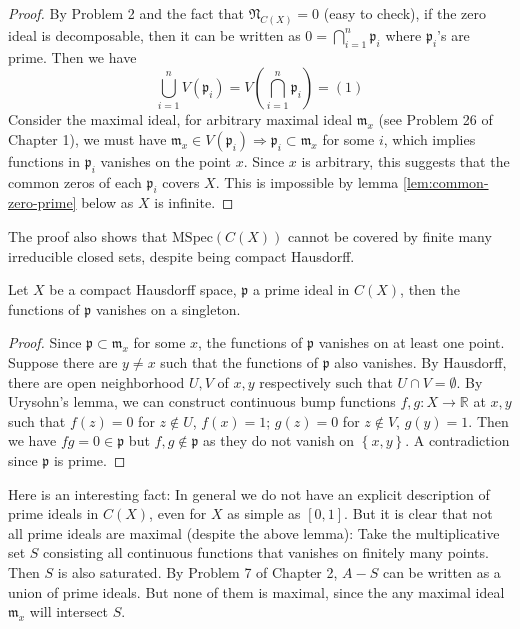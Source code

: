 \documentclass{solution}
\begin{document}
\begin{proof}
    By Problem 2 and the fact that $\mathfrak{N}_{C(X)} = 0$ (easy to check), if the zero ideal is decomposable, then it can be written as $0 = \bigcap\limits_{i = 1}^{n} \mathfrak{p}_i$ where $\mathfrak{p}_i$'s are prime. Then we have
    $$\bigcup\limits_{i = 1}^{n} V(\mathfrak{p}_i) = V\left(\bigcap\limits_{i = 1}^{n}\mathfrak{p}_i\right) = (1)$$
    Consider the maximal ideal, for arbitrary maximal ideal $\mathfrak{m}_x$ (see Problem 26 of Chapter 1), we must have $\mathfrak{m}_x \in V(\mathfrak{p}_i) \Rightarrow \mathfrak{p}_i \subset \mathfrak{m}_x$ for some $i$, which implies functions in $\mathfrak{p}_i$ vanishes on the point $x$. Since $x$ is arbitrary, this suggests that the common zeros of each $\mathfrak{p}_i$ covers $X$. This is impossible by lemma \ref{lem:common-zero-prime} below as $X$ is infinite.
\end{proof}

{\color{red} The proof also shows that $\mathrm{MSpec}(C(X))$ cannot be covered by finite many irreducible closed sets, despite being compact Hausdorff.}

\begin{lemma}\label{lem:common-zero-prime}
    Let $X$ be a compact Hausdorff space, $\mathfrak{p}$ a prime ideal in $C(X)$, then the functions of $\mathfrak{p}$ vanishes on a singleton.
\end{lemma}

\begin{proof}
    Since $\mathfrak{p} \subset \mathfrak{m}_x$ for some $x$, the functions of $\mathfrak{p}$ vanishes on at least one point. Suppose there are $y \ne x$ such that the functions of $\mathfrak{p}$ also vanishes. By Hausdorff, there are open neighborhood $U, V$ of $x, y$ respectively such that $U \cap V = \emptyset$. By Urysohn's lemma, we can construct continuous bump functions $f, g: X \rightarrow \mathbb{R}$ at $x, y$ such that $f(z) = 0$ for $z \notin U$, $f(x) = 1$; $g(z) = 0$ for $z \notin V$, $g(y) = 1$. Then we have $fg = 0 \in \mathfrak{p}$ but $f, g \notin \mathfrak{p}$ as they do not vanish on $\left\lbrace x, y \right\rbrace$. A contradiction since $\mathfrak{p}$ is prime.
\end{proof}

{\color{red} Here is an interesting fact: In general we do not have an explicit description of prime ideals in $C(X)$, even for $X$ as simple as $[0, 1]$. But it is clear that not all prime ideals are maximal (despite the above lemma): Take the multiplicative set $S$ consisting all continuous functions that vanishes on finitely many points. Then $S$ is also saturated. By Problem 7 of Chapter 2, $A - S$ can be written as a union of prime ideals. But none of them is maximal, since the any maximal ideal $\mathfrak{m}_x$ will intersect $S$.}
\end{document}
